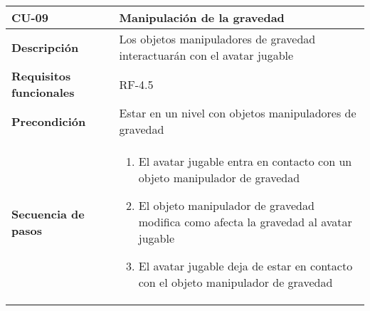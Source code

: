 \begin{longtable}{l|l}
\begin{minipage}{0.25\columnwidth}
\textbf{CU-09} 
\end{minipage}
&
\begin{minipage}{0.65\columnwidth}
Manipulación de la gravedad
\end{minipage}
\\ \hline

\begin{minipage}{0.25\columnwidth}
\textbf{Descripción} 
\end{minipage}
&
\begin{minipage}{0.65\columnwidth}
Los objetos manipuladores de gravedad interactuarán con el avatar jugable
\end{minipage}
\\ \hline

\begin{minipage}{0.25\columnwidth}
\textbf{Requisitos funcionales} 
\end{minipage}
&
\begin{minipage}{0.65\columnwidth}
RF-4.5
\end{minipage}
\\ \hline

\begin{minipage}{0.25\columnwidth}
\textbf{Precondición} 
\end{minipage}
&
\begin{minipage}{0.65\columnwidth}
Estar en un nivel con objetos manipuladores de gravedad
\end{minipage}
\\ \hline

\begin{minipage}{0.25\columnwidth}
\textbf{Secuencia de pasos} 
\end{minipage}
&
\begin{minipage}{0.65\columnwidth}
\begin{enumerate}
\item
El avatar jugable entra en contacto con un objeto manipulador de gravedad
\item
El objeto manipulador de gravedad modifica como afecta la gravedad al avatar jugable
\item
El avatar jugable deja de estar en contacto con el objeto manipulador de gravedad
\end{enumerate}
\end{minipage}
\\ \hline


\end{longtable}
